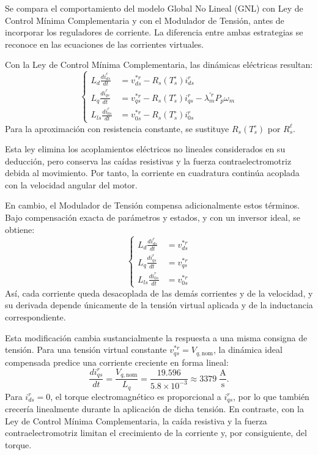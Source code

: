 \documentclass[blue,fullpaper]{ludusofficial}  %
\begin{document}
Se compara el comportamiento del modelo Global No Lineal (GNL)
con Ley de Control Mínima Complementaria y con el Modulador de
Tensión, antes de incorporar los reguladores de corriente.
La diferencia entre ambas estrategias se reconoce en las
ecuaciones de las corrientes virtuales.

Con la Ley de Control Mínima Complementaria, las dinámicas
eléctricas resultan:
\begin{equation}
\left\{
\begin{aligned}
    L_d \frac{di_{ds}^{r}}{dt}
    &= v_{ds}^{*r} - R_s(T_s^\circ)i_{ds}^{r} \\
    L_q \frac{di_{qs}^{r}}{dt}
    &= v_{qs}^{*r} - R_s(T_s^\circ)i_{qs}^{r}
       - \lambda_m^{'r}P_p\omega_m \\
    L_{ls} \frac{di_{0s}^{r}}{dt}
    &= v_{0s}^{*r} - R_s(T_s^\circ)i_{0s}^{r}
\end{aligned}
\right.
\label{eq:corrientes-ley-mc}
\end{equation}
Para la aproximación con resistencia constante, se sustituye
$R_s(T_s^\circ)$ por $R_s^\ell$.

Esta ley elimina los acoplamientos eléctricos no lineales
considerados en su deducción, pero conserva las caídas resistivas
y la fuerza contraelectromotriz debida al movimiento. Por tanto,
la corriente en cuadratura continúa acoplada con la velocidad
angular del motor.

En cambio, el Modulador de Tensión compensa adicionalmente estos
términos. Bajo compensación exacta de parámetros y estados, y con
un inversor ideal, se obtiene:
\begin{equation}
\left\{
\begin{aligned}
    L_d \frac{di_{ds}^{r}}{dt} &= v_{ds}^{*r} \\
    L_q \frac{di_{qs}^{r}}{dt} &= v_{qs}^{*r} \\
    L_{ls} \frac{di_{0s}^{r}}{dt} &= v_{0s}^{*r}
\end{aligned}
\right.
\label{eq:corrientes-modulador-tension}
\end{equation}
Así, cada corriente queda desacoplada de las demás corrientes y
de la velocidad, y su derivada depende únicamente de la tensión
virtual aplicada y de la inductancia correspondiente.

Esta modificación cambia sustancialmente la respuesta a una
misma consigna de tensión. Para una tensión virtual constante
$v_{qs}^{*r}=V_{q,\mathrm{nom}}$, la dinámica ideal compensada
predice una corriente creciente en forma lineal:
\begin{equation}
    \frac{di_{qs}^{r}}{dt}
    = \frac{V_{q,\mathrm{nom}}}{L_q}
    = \frac{19.596}{5.8\times10^{-3}}
    \approx 3379\;\mathrm{\frac{A}{s}}.
\end{equation}
Para $i_{ds}^{r}=0$, el torque electromagnético es proporcional
a $i_{qs}^{r}$, por lo que también crecería linealmente durante
la aplicación de dicha tensión. En contraste, con la Ley de
Control Mínima Complementaria, la caída resistiva y la fuerza
contraelectromotriz limitan el crecimiento de la corriente y,
por consiguiente, del torque.
\end{document}
